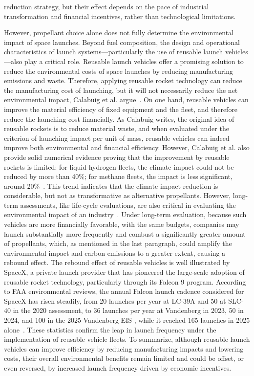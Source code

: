 \documentclass[12pt]{article}
\begin{document}
reduction strategy, but their effect depends on the pace of industrial transformation and financial incentives, rather than technological limitations.



However, propellant choice alone does not fully determine the environmental impact of space launches. Beyond fuel composition, the design and operational characteristics of launch systems---particularly the use of reusable launch vehicles---also play a critical role. Reusable launch vehicles offer a promising solution to reduce the environmental costs of space launches by reducing manufacturing emissions and waste. Therefore, applying reusable rocket technology can reduce the manufacturing cost of launching, but it will not necessarily reduce the net environmental impact, Calabuig et al. argue~\citep{calabuig2024reusable}. On one hand, reusable vehicles can improve the material efficiency of fixed equipment and the fleet, and therefore reduce the launching cost financially. As Calabuig writes, the original idea of reusable rockets is to reduce material waste, and when evaluated under the criterion of launching impact per unit of mass, reusable vehicles can indeed improve both environmental and financial efficiency. However, Calabuig et al. also provide solid numerical evidence proving that the improvement by reusable rockets is limited: for liquid hydrogen fleets, the climate impact could not be reduced by more than 40\%; for methane fleets, the impact is less significant, around 20\%~\citep{calabuig2024reusable}. This trend indicates that the climate impact reduction is considerable, but not as transformative as alternative propellants. However, long-term assessments, like life-cycle evaluations, are also critical in evaluating the environmental impact of an industry~\citep{wilson2022lifecycle}. Under long-term evaluation, because such vehicles are more financially favorable, with the same budgets, companies may launch substantially more frequently and combust a significantly greater amount of propellants, which, as mentioned in the last paragraph, could amplify the environmental impact and carbon emissions to a greater extent, causing a rebound effect. The rebound effect of reusable vehicles is well illustrated by SpaceX, a private launch provider that has pioneered the large-scale adoption of reusable rocket technology, particularly through its Falcon 9 program. According to FAA environmental reviews, the annual Falcon launch cadence considered for SpaceX has risen steadily, from 20 launches per year at LC-39A and 50 at SLC-40 in the 2020 assessment, to 36 launches per year at Vandenberg in 2023, 50 in 2024, and 100 in the 2025 Vandenberg EIS \citep{faa2025falconprogram}, while it reached 165 launches in 2025 alone~\citep{mcdowell2025space}. These statistics confirm the leap in launch frequency under the implementation of reusable vehicle fleets. To summarize, although reusable launch vehicles can improve efficiency by reducing manufacturing impacts and lowering costs, their overall environmental benefits remain limited and could be offset, or even reversed, by increased launch frequency driven by economic incentives.
\end{document}
